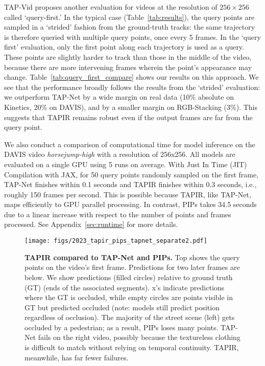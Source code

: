\documentclass[10pt,twocolumn,letterpaper]{article}
\begin{document}
TAP-Vid proposes another evaluation for videos at the resolution of $256 \times 256$ called `query-first.'  In the typical case (Table~\ref{tab:results}), the query points are sampled in a `strided' fashion from the ground-truth tracks: the same trajectory is therefore queried with multiple query points, once every 5 frames.  In the `query first' evaluation, only the first point along each trajectory is used as a query.  These points are slightly harder to track than those in the middle of the video, because there are more intervening frames wherein the point's appearance may change.   Table~\ref{tab:query_first_compare} shows our results on this approach.  We see that the performance broadly follows the results from the `strided' evaluation: we outperform TAP-Net by a wide margin on real data (10\% absolute on Kinetics, 20\% on DAVIS), and by a smaller margin on RGB-Stacking (3\%).  This suggests that TAPIR remains robust even if the output frames are far from the query point.  


We also conduct a comparison of computational time for model inference on the DAVIS video \textit{horsejump-high} with a resolution of 256x256. All models are evaluated on a single GPU using 5 runs on average. With Just In Time (JIT) Compilation with JAX, for 50 query points randomly sampled on the first frame, TAP-Net finishes within 0.1 seconds and TAPIR finishes within 0.3 seconds, i.e., roughly 150 frames per second.  This is possible because TAPIR, like TAP-Net, maps efficiently to GPU parallel processing. In contrast, PIPs takes 34.5 seconds due to a linear increase with respect to the number of points and frames processed. See Appendix~\ref{sec:runtime} for more details. 

\begin{figure*}[t]
\begin{center}
\texttt{[image: figs/2023\_tapir\_pips\_tapnet\_separate2.pdf]}
\end{center}
\caption{\textbf{TAPIR compared to TAP-Net and PIPs.} Top shows the query points on the video's first frame.  Predictions for two later frames are below.  We show predictions (filled circles) relative to ground truth (GT) (ends of the associated segments).  x's indicate predictions where the GT is occluded, while empty circles are  points visible in GT but predicted occluded (note: models still predict position regardless of occlusion).  The majority of the street scene (left) gets occluded by a pedestrian; as a result, PIPs loses many points.  TAP-Net fails on the right video, possibly because the textureless clothing is difficult to match without relying on temporal continuity.  TAPIR, meanwhile, has far fewer failures.}
\label{fig:compare}
\end{figure*}
\end{document}
